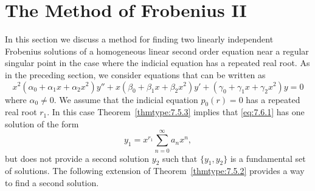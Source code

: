 \section{The Method of Frobenius II}

\noindent
In this section we discuss a method for finding two linearly independent Frobenius solutions of a
homogeneous linear second order equation near a regular singular point in the case where the
indicial equation has a repeated real root. As in the preceding section, we consider equations that
can be written as
\begin{equation}
  \label{eq:7.6.1}x^{2}(\alpha_{0}+\alpha_{1}x+\alpha_{2}x^{2})y''+x(\beta_{0}+\beta_{1}x+\beta_{2}x^{2})y' +(\gamma_{0}+\gamma_{1}x+\gamma_{2}x^{2})y=0
\end{equation}
where $\alpha_{0}\ne0$. We assume that the indicial equation $p_{0}(r)=0$ has a repeated real root
$r_{1}$. In this case Theorem~\ref{thmtype:7.5.3} implies that \eqref{eq:7.6.1} has one solution of
the form
\[
  y_{1}=x^{r_{1}}\sum_{n=0}^{\infty}a_{n}x^{n},
\]
but does not provide a second solution $y_{2}$ such that $\{y_{1},y_{2}\}$ is a fundamental set of
solutions. The following extension of Theorem~\ref{thmtype:7.5.2} provides a way to find a second
solution.

